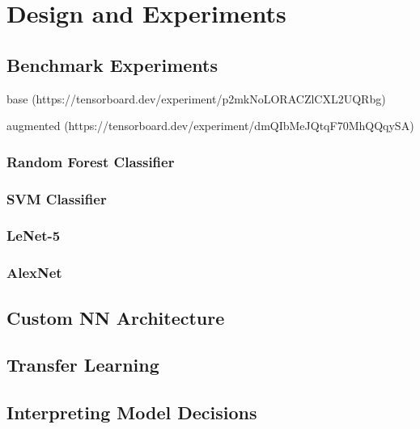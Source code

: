 \chapter{Design and Experiments}

\section{Benchmark Experiments}
base (https://tensorboard.dev/experiment/p2mkNoLORACZlCXL2UQRbg)


augmented (https://tensorboard.dev/experiment/dmQIbMeJQtqF70MhQQqySA)
\subsection{Random Forest Classifier}
\subsection{SVM Classifier}
\subsection{LeNet-5}
\subsection{AlexNet}

\section{Custom NN Architecture}

\section{Transfer Learning}

\section{Interpreting Model Decisions}